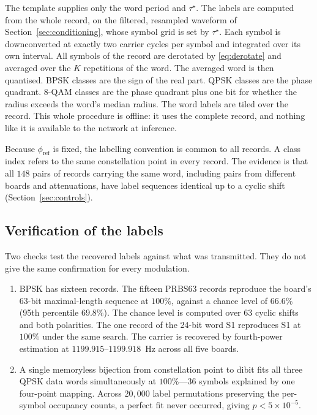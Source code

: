 \documentclass{ieeeaccess}
\begin{document}
The template supplies only the word period and $\tau^{\star}$. The labels are computed from the whole record, on the filtered, resampled waveform of Section~\ref{sec:conditioning}, whose symbol grid is set by $\tau^{\star}$. Each symbol is downconverted at exactly two carrier cycles per symbol and integrated over its own interval. All symbols of the record are derotated by \eqref{eq:derotate} and averaged over the $K$ repetitions of the word. The averaged word is then quantised. BPSK classes are the sign of the real part. QPSK classes are the phase quadrant. 8-QAM classes are the phase quadrant plus one bit for whether the radius exceeds the word's median radius. The word labels are tiled over the record. This whole procedure is offline: it uses the complete record, and nothing like it is available to the network at inference.

Because $\phi_{\mathrm{ref}}$ is fixed, the labelling convention is common to all records. A class index refers to the same constellation point in every record. The evidence is that all $148$ pairs of records carrying the same word, including pairs from different boards and attenuations, have label sequences identical up to a cyclic shift (Section~\ref{sec:controls}).

\subsection{Verification of the labels}
Two checks test the recovered labels against what was transmitted. They do not
give the same confirmation for every modulation.

\begin{enumerate}
\item BPSK has sixteen records. The fifteen PRBS63 records reproduce the board's
63-bit maximal-length sequence at $100\%$, against a chance level of $66.6\%$
(95th percentile $69.8\%$). The chance level is computed over 63 cyclic shifts
and both polarities. The one record of the 24-bit word S1 reproduces S1 at
$100\%$ under the same search. The carrier is recovered by fourth-power
estimation at $1199.915$--$1199.918$~Hz across all five boards.
\item A single memoryless bijection from constellation point to dibit fits all
three QPSK data words simultaneously at $100\%$---36 symbols explained by one
four-point mapping. Across $20{,}000$ label permutations preserving the
per-symbol occupancy counts, a perfect fit never occurred, giving
$p < 5\times10^{-5}$.
\end{enumerate}
\end{document}
